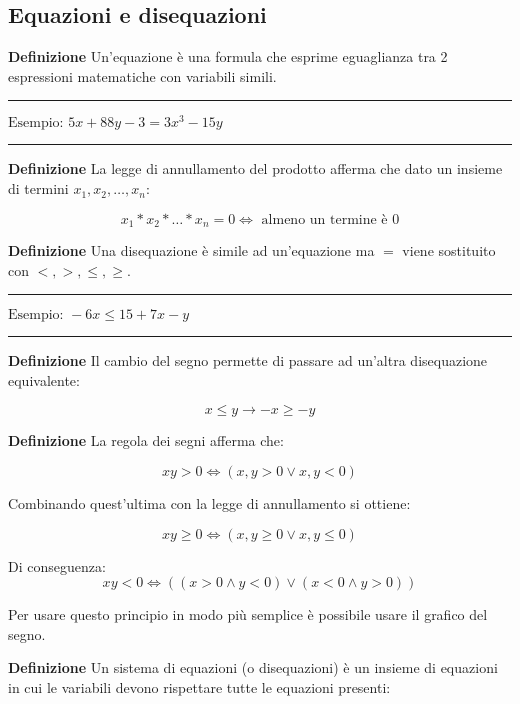 \documentclass{article}
\begin{document}
\subsection{Equazioni e disequazioni}

\textbf{Definizione} Un'equazione è una formula che esprime eguaglianza tra 2 espressioni matematiche con variabili simili.\newline

\noindent\rule{\textwidth}{0.5pt}

$\text{Esempio: } 5x+88y-3=3x^3-15y$

\noindent\rule{\textwidth}{0.5pt}\newline

\noindent\textbf{Definizione} La legge di annullamento del prodotto afferma che dato un insieme di termini $x_1,x_2,\ldots,x_n$:

$$x_1*x_2*\ldots*x_n=0\iff \text{ almeno un termine è 0}$$\newline

\noindent\textbf{Definizione} Una disequazione è simile ad un'equazione ma $=$ viene sostituito con $<,>,\leq,\geq$.\newline

\noindent\rule{\textwidth}{0.5pt}

$\text{Esempio: } -6x\leq 15+7x-y$

\noindent\rule{\textwidth}{0.5pt}\newline

\noindent\textbf{Definizione} Il cambio del segno permette di passare ad un'altra disequazione equivalente:

$$x\leq y \rightarrow -x\geq -y$$\newpage

\noindent\textbf{Definizione} La regola dei segni afferma che:

$$xy>0\iff (x,y>0\vee x,y<0)$$\newline

\noindent Combinando quest'ultima con la legge di annullamento si ottiene:

$$xy\geq0\iff (x,y\geq0\vee x,y\leq0)$$\newline

\noindent Di conseguenza:
$$xy<0\iff ((x>0\wedge y<0)\vee(x<0\wedge y>0))$$\newline

\noindent Per usare questo principio in modo più semplice è possibile usare il grafico del segno.\newline

\noindent\textbf{Definizione} Un sistema di equazioni (o disequazioni) è un insieme di equazioni in cui le variabili devono rispettare tutte le equazioni presenti:
\end{document}
